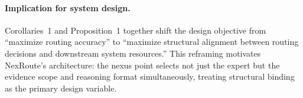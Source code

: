 \paragraph{Implication for system design.}
Corollaries~1 and Proposition~1 together shift the design objective from
``maximize routing accuracy'' to ``maximize structural alignment between routing
decisions and downstream system resources.'' This reframing motivates NexRoute's
architecture: the nexus point selects not just the expert but the evidence scope
and reasoning format simultaneously, treating structural binding as the primary
design variable.

